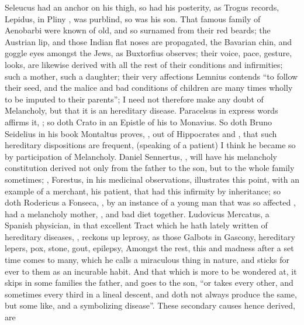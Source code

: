 Seleucus had an anchor on his thigh, so had his posterity, as Trogus records,
 Lepidus, in Pliny , was purblind, so was his son. That famous family of Aenobarbi were known
of old, and so surnamed from their red beards; the Austrian lip, and those
Indian flat noses are propagated, the Bavarian chin, and goggle eyes amongst
the Jews, as Buxtorfius observes; their voice, pace,
gesture, looks, are likewise derived with all the rest of their conditions and
infirmities; such a mother, such a daughter; their very
affections Lemnius contends \enquote{to follow their seed, and the
malice and bad conditions of children are many times wholly to be imputed to
their parents}; I need not therefore make any doubt of Melancholy, but that it
is an hereditary disease. Paracelsus in express words
affirms it, ; so doth
Crato in an Epistle of his to Monavius. So doth Bruno
Seidelius in his book  Montaltus
proves, , out of Hippocrates and \Plutarch{}, that
such hereditary dispositions are frequent,  (speaking of a patient) I think he
became so by participation of Melancholy. Daniel Sennertus,
, will have his melancholy
constitution derived not only from the father to the son, but to the whole
family sometimes; ,
Forestus, in his medicinal observations, illustrates this
point, with an example of a merchant, his patient, that had this infirmity by
inheritance; so doth Rodericus a Fonseca, , by an instance of a young man that was so affected , had a melancholy mother, , and bad
diet together. Ludovicus Mercatus, a Spanish physician, in that excellent Tract
which he hath lately written of hereditary diseases, , reckons up leprosy, as those Galbots in
Gascony, hereditary lepers, pox, stone, gout, epilepsy, \etc{} Amongst the
rest, this and madness after a set time comes to many, which he calls a
miraculous thing in nature, and sticks for ever to them as an incurable habit.
And that which is more to be wondered at, it skips in some families the father,
and goes to the son, \enquote{or takes every other, and sometimes
every third in a lineal descent, and doth not always produce the same, but some
like, and a symbolizing disease}. These secondary causes hence derived, are
